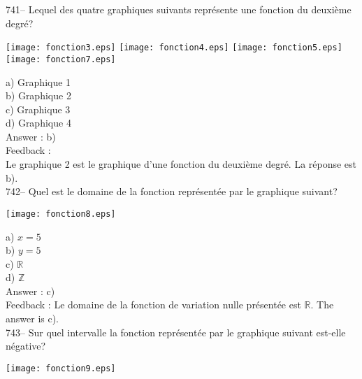 \documentclass[letterpaper, 12pt]{article}
\begin{document}
741-- Lequel des quatre graphiques suivants repr\'esente une fonction du
deuxi\`eme degr\'e?\\
    \begin{center}
    \texttt{[image: fonction3.eps]}
\texttt{[image: fonction4.eps]}
\texttt{[image: fonction5.eps]}
\texttt{[image: fonction7.eps]}

    \end{center}
a) Graphique 1\\
b) Graphique 2\\
c) Graphique 3\\
d) Graphique 4\\

Answer : b)\\

Feedback : \\
Le graphique 2 est le graphique d'une fonction du deuxi\`eme degr\'e.  La
r\'eponse est b).\\

742-- Quel est le domaine de la fonction repr\'esent\'ee par le graphique
suivant?

    \begin{center}
    \texttt{[image: fonction8.eps]}
    \end{center}
a) $x=5$\\
b) $y=5$\\
c) $\mathbb{R}$\\
d) $\mathbb{Z}$\\

Answer : c)\\

Feedback :
Le domaine de la fonction de variation nulle pr\'esent\'ee est $\mathbb{R}$.
  The answer is c).\\

743-- Sur quel intervalle la fonction repr\'esent\'ee par le graphique
suivant est-elle n\'egative?\\

    \begin{center}
    \texttt{[image: fonction9.eps]}
    \end{center}
\end{document}
